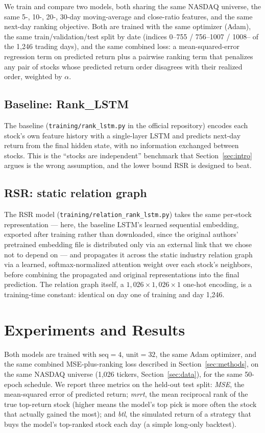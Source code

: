 \documentclass[11pt]{article}
\begin{document}
We train and compare two models, both sharing the same NASDAQ universe, the same 5-, 10-, 20-,
30-day moving-average and close-ratio features, and the same next-day ranking objective. Both
are trained with the same optimizer (Adam), the same train/validation/test split by date
(indices 0--755 / 756--1007 / 1008-- of the 1{,}246 trading days), and the same combined loss:
a mean-squared-error regression term on predicted return plus a pairwise ranking term that
penalizes any pair of stocks whose predicted return order disagrees with their realized order,
weighted by $\alpha$.

\subsection{Baseline: Rank\_LSTM}

The baseline (\texttt{training/rank\_lstm.py} in the official repository) encodes each stock's own
feature history with a single-layer LSTM and predicts next-day return from the final hidden state,
with no information exchanged between stocks. This is the ``stocks are independent'' benchmark
that Section~\ref{sec:intro} argues is the wrong assumption, and the lower bound RSR is designed to
beat.

\subsection{RSR: static relation graph}

The RSR model (\texttt{training/relation\_rank\_lstm.py}) takes the same per-stock representation
--- here, the baseline LSTM's learned sequential embedding, exported after training rather than
downloaded, since the original authors' pretrained embedding file is distributed only via an
external link that we chose not to depend on --- and propagates it across the static industry
relation graph via a learned, softmax-normalized attention weight over each stock's neighbors,
before combining the propagated and original representations into the final prediction. The
relation graph itself, a $1{,}026\times1{,}026\times1$ one-hot encoding, is a training-time
constant: identical on day one of training and day 1{,}246.

\section{Experiments and Results}
\label{sec:results}

Both models are trained with $\text{seq}=4$, $\text{unit}=32$, the same Adam optimizer, and
the same combined MSE-plus-ranking loss described in Section~\ref{sec:methods}, on the same
NASDAQ universe (1{,}026 tickers, Section~\ref{sec:data}), for the same 50-epoch schedule. We
report three metrics on the held-out test split: \emph{MSE}, the mean-squared error of predicted
return; \emph{mrrt}, the mean reciprocal rank of the true top-return stock (higher means the
model's top pick is more often the stock that actually gained the most); and \emph{btl}, the
simulated return of a strategy that buys the model's top-ranked stock each day (a simple
long-only backtest).
\end{document}
